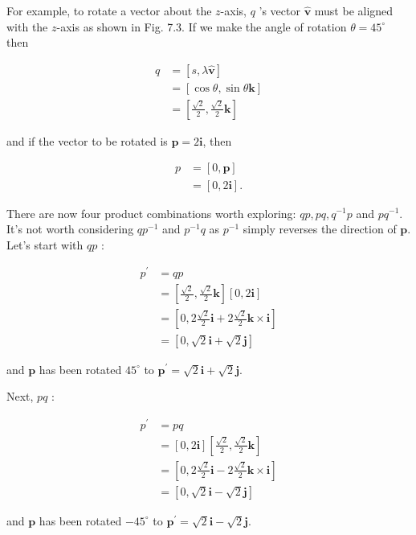 For example, to rotate a vector about the $z$-axis, $q$ 's vector $\hat{\mathbf{v}}$ must be aligned with the $z$-axis as shown in Fig. 7.3. If we make the angle of rotation $\theta=45^{\circ}$ then

$$
\begin{aligned}
q & =[s, \lambda \hat{\mathbf{v}}] \\
& =[\cos \theta, \sin \theta \mathbf{k}] \\
& =\left[\frac{\sqrt{2}}{2}, \frac{\sqrt{2}}{2} \mathbf{k}\right]
\end{aligned}
$$

and if the vector to be rotated is $\mathbf{p}=2 \mathbf{i}$, then

$$
\begin{aligned}
p & =[0, \mathbf{p}] \\
& =[0,2 \mathbf{i}] .
\end{aligned}
$$

There are now four product combinations worth exploring: $q p, p q, q^{-1} p$ and $p q^{-1}$. It's not worth considering $q p^{-1}$ and $p^{-1} q$ as $p^{-1}$ simply reverses the direction of $\mathbf{p}$. Let's start with $q p$ :

$$
\begin{aligned}
p^{\prime} & =q p \\
& =\left[\frac{\sqrt{2}}{2}, \frac{\sqrt{2}}{2} \mathbf{k}\right][0,2 \mathbf{i}] \\
& =\left[0,2 \frac{\sqrt{2}}{2} \mathbf{i}+2 \frac{\sqrt{2}}{2} \mathbf{k} \times \mathbf{i}\right] \\
& =[0, \sqrt{2} \mathbf{i}+\sqrt{2} \mathbf{j}]
\end{aligned}
$$

and $\mathbf{p}$ has been rotated $45^{\circ}$ to $\mathbf{p}^{\prime}=\sqrt{2} \mathbf{i}+\sqrt{2} \mathbf{j}$.

Next, $p q$ :

$$
\begin{aligned}
p^{\prime} & =p q \\
& =[0,2 \mathbf{i}]\left[\frac{\sqrt{2}}{2}, \frac{\sqrt{2}}{2} \mathbf{k}\right] \\
& =\left[0,2 \frac{\sqrt{2}}{2} \mathbf{i}-2 \frac{\sqrt{2}}{2} \mathbf{k} \times \mathbf{i}\right] \\
& =[0, \sqrt{2} \mathbf{i}-\sqrt{2} \mathbf{j}]
\end{aligned}
$$

and $\mathbf{p}$ has been rotated $-45^{\circ}$ to $\mathbf{p}^{\prime}=\sqrt{2} \mathbf{i}-\sqrt{2} \mathbf{j}$.

